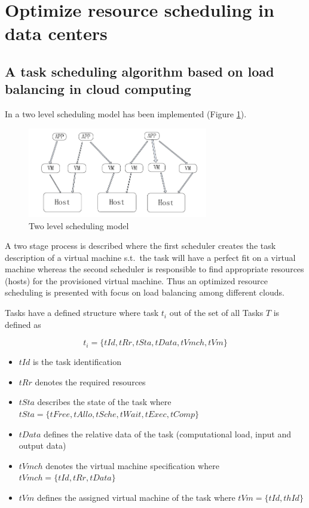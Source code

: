 \section{Optimize resource scheduling in data centers}

\subsection{A task scheduling algorithm based on load balancing in cloud computing}

In \cite{fang2010task} a two level scheduling model has been implemented (Figure \ref{fig:two_level_resource_scheduling}). 

\begin{figure}[htbp]
	\centering
		\includegraphics[width=0.7\textwidth]{figures/state_of_the_art/two_level_resource_scheduling.PNG}
	\caption{Two level scheduling model \cite{fang2010task}}
	\label{fig:two_level_resource_scheduling}
\end{figure}

A two stage process is described where the first scheduler creates the task description of a virtual machine s.t.~the task will have a perfect fit on a virtual machine whereas the second scheduler is responsible to find appropriate resources (hosts) for the provisioned virtual machine. Thus an optimized resource scheduling is presented with focus on load balancing among different clouds. 

Tasks have a defined structure where task $t_i$ out of the set of all Tasks $T$ is defined as 

\[t_i = \{tId, tRr, tSta, tData, tVmch, tVm\}\]

\begin{itemize}
	\item $tId$ is the task identification
	\item $tRr$ denotes the required resources
	\item $tSta$ describes the state of the task where $tSta = \{tFree,tAllo,tSche,tWait,tExec,tComp\}$
	\item $tData$ defines the relative data of the task (computational load, input and output data)
	\item $tVmch$ denotes the virtual machine specification where $tVmch = \{tId,tRr,tData\}$
	\item $tVm$ defines the assigned virtual machine of the task where $tVm = \{tId,thId\}$
\end{itemize}

